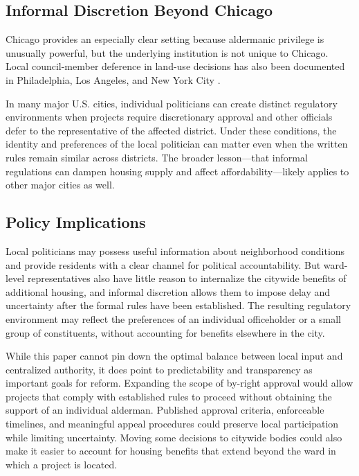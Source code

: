 \subsection{Informal Discretion Beyond Chicago}
\label{subsec:beyond_chicago}

Chicago provides an especially clear setting because aldermanic privilege is unusually powerful, but the underlying institution is not unique to Chicago.
Local council-member deference in land-use decisions has also been documented in Philadelphia, Los Angeles, and New York City
\citep{the_pew_charitable_trusts_philadelphias_2015, ryu_limiting_2020, anbinder_new_2025, new_york_city_charter_revision_commission_charter_2025, mitre-becerril_does_2024, burnett_local_2014, jacobson_dysfunctional_2023}.

In many major U.S. cities, individual politicians can create distinct regulatory environments when projects require discretionary approval and other officials defer to the representative of the affected district.
Under these conditions, the identity and preferences of the local politician can matter even when the written rules remain similar across districts.
The broader lesson---that informal regulations can dampen housing supply and affect affordability---likely applies to other major cities as well.

\subsection{Policy Implications}
\label{subsec:policy_implications}

Local politicians may possess useful information about neighborhood conditions and provide residents with a clear channel for political accountability.
But ward-level representatives also have little reason to internalize the citywide benefits of additional housing, and informal discretion allows them to impose delay and uncertainty after the formal rules have been established.
The resulting regulatory environment may reflect the preferences of an individual officeholder or a small group of constituents, without accounting for benefits elsewhere in the city.

While this paper cannot pin down the optimal balance between local input and centralized authority, it does point to predictability and transparency as important goals for reform.
Expanding the scope of by-right approval would allow projects that comply with established rules to proceed without obtaining the support of an individual alderman.
Published approval criteria, enforceable timelines, and meaningful appeal procedures could preserve local participation while limiting uncertainty.
Moving some decisions to citywide bodies could also make it easier to account for housing benefits that extend beyond the ward in which a project is located.

